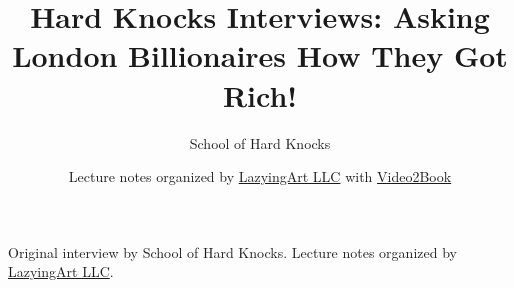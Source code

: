 \documentclass[11pt,oneside]{book}
\begin{document}
\frontmatter
\title{Hard Knocks Interviews: Asking London Billionaires How They Got Rich!}
\author{School of Hard Knocks}
\date{Lecture notes organized by \href{https://lazying.art}{LazyingArt LLC} with \href{https://github.com/lachlanchen/Video2Book}{Video2Book}}
\maketitle
\begin{center}
\small Original interview by School of Hard Knocks. Lecture notes organized by \href{https://lazying.art}{LazyingArt LLC}.
\end{center}
\clearpage
\mainmatter

\end{document}
